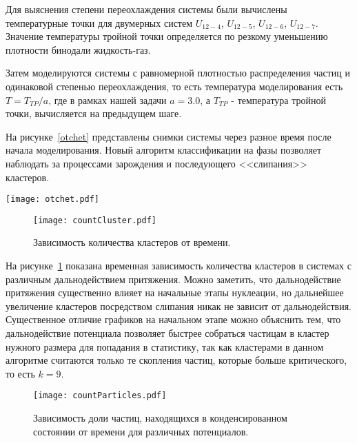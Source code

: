 Для выяснения степени переохлаждения системы были вычислены температурные точки для двумерных систем $U_{12-4}$, $U_{12-5}$, $U_{12-6}$, $U_{12-7}$. Значение температуры тройной точки определяется по резкому уменьшению плотности бинодали жидкость-газ.

Затем моделируются системы с равномерной плотностью распределения частиц и одинаковой степенью переохлаждения, то есть температура моделирования есть $T = T_{TP} / a$, где в рамках нашей задачи $a = 3.0$, а $T_{TP}$ - температура тройной точки, вычисляется на предыдущем шаге.

На рисунке~\ref{otchet} представлены снимки системы через разное время после начала моделирования. Новый алгоритм классификации на фазы позволяет наблюдать за процессами зарождения и последующего <<слипания>> кластеров.



\begin{figure*}[!t]
	 \centering
	 \texttt{[image: otchet.pdf]}
	 \caption{Процесс зарождения и роста кластеров в переохлажденной системе частиц взаимодействующих посредством потенциала Леннарда-Джонса.}
	 \label{otchet}
\end{figure*}


\begin{figure}[!t]
    \centering
    \texttt{[image: countCluster.pdf]}
    \caption{Зависимость количества кластеров от времени.}
    \label{countCluster}
\end{figure}

На рисунке~\ref{countCluster} показана временная зависимость количества кластеров в системах с различным дальнодействием притяжения. Можно заметить, что дальнодействие притяжения существенно влияет на начальные этапы нуклеации, но дальнейшее увеличение кластеров посредством слипания никак не зависит от дальнодействия. Существенное отличие графиков на начальном этапе можно объяснить тем, что дальнодействие потенциала позволяет быстрее собраться частицам в кластер нужного размера для попадания в статистику, так как кластерами в данном алгоритме считаются только те скопления частиц, которые больше критического, то есть $k = 9$.

\begin{figure}[!t]
    \centering
    \texttt{[image: countParticles.pdf]}
    \caption{Зависимость доли частиц, находящихся в конденсированном состоянии от времени для различных потенциалов.}
    \label{countParticles}
\end{figure}

